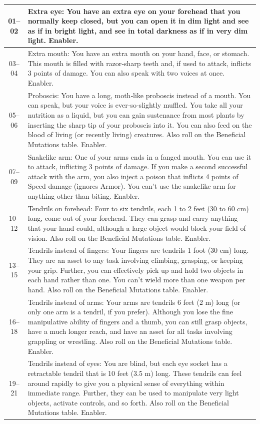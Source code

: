 \begin{longtable}{| c | p{15cm} |}
01–02 & Extra eye: You have an extra eye on your forehead that you normally keep closed, but you can open it in dim light and see as if in bright light, and see in total darkness as if in very dim light. Enabler. \\ \hline
03–04 & Extra mouth: You have an extra mouth on your hand, face, or stomach. This mouth is filled with razor‑sharp teeth and, if used to attack, inflicts 3 points of damage. You can also speak with two voices at once. Enabler. \\ \hline
05–06 & Proboscis: You have a long, moth‑like proboscis instead of a mouth. You can speak, but your voice is ever‑so‑slightly muffled. You take all your nutrition as a liquid, but you can gain sustenance from most plants by inserting the sharp tip of your proboscis into it. You can also feed on the blood of living (or recently living) creatures. Also roll on the Beneficial Mutations table. Enabler. \\ \hline
07–09 & Snakelike arm: One of your arms ends in a fanged mouth. You can use it to attack, inflicting 3 points of damage. If you make a second successful attack with the arm, you also inject a poison that inflicts 4 points of Speed damage (ignores Armor). You can’t use the snakelike arm for anything other than biting. Enabler. \\ \hline
10–12 & Tendrils on forehead: Four to six tendrils, each 1 to 2 feet (30 to 60 cm) long, come out of your forehead. They can grasp and carry anything that your hand could, although a large object would block your field of vision. Also roll on the Beneficial Mutations table. Enabler. \\ \hline
13–15 & Tendrils instead of fingers: Your fingers are tendrils 1 foot (30 cm) long. They are an asset to any task involving climbing, grasping, or keeping your grip. Further, you can effectively pick up and hold two objects in each hand rather than one. You can’t wield more than one weapon per hand. Also roll on the Beneficial Mutations table. Enabler. \\ \hline
16–18 & Tendrils instead of arms: Your arms are tendrils 6 feet (2 m) long (or only one arm is a tendril, if you prefer). Although you lose the fine manipulative ability of fingers and a thumb, you can still grasp objects, have a much longer reach, and have an asset for all tasks involving grappling or wrestling. Also roll on the Beneficial Mutations table. Enabler. \\ \hline
19–21 & Tendrils instead of eyes: You are blind, but each eye socket has a retractable tendril that is 10 feet (3.5 m) long. These tendrils can feel around rapidly to give you a physical sense of everything within immediate range. Further, they can be used to manipulate very light objects, activate controls, and so forth. Also roll on the Beneficial Mutations table. Enabler. \\ \hline

\end{longtable}
